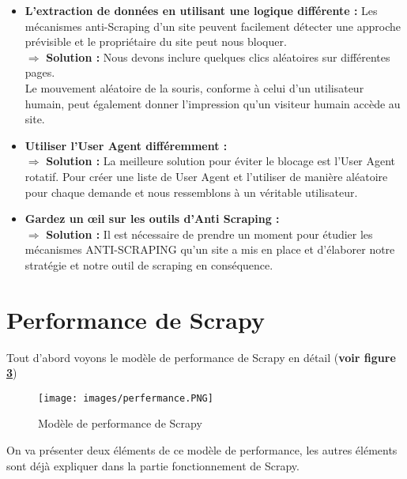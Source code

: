 \begin{itemize}[label=,font=\normalsize]
            \begin{figure}[H]
            \centering
            \texttt{[image: images/Mon IP.PNG]}
            \caption{Ma propre adresse IP}
            \label{fig:ip}  
        \end{figure}
        $\Rightarrow$ \textbf{Dans notre cas :} On utilise TOP Browser pour changer notre IP à chaque fois,\\ \noindent\textbf{la figure \ref{fig:Ban}} montre la nouvelle adresse définie par Tor Browser
        \begin{figure}[H]
            \centering
            \texttt{[image: images/TOR Browser.png]}
            \caption{Changer l'IP avec TOR Browser}
            \label{fig:Ban}  
        \end{figure}
        \item\textbf{L’extraction de données en utilisant une logique différente :} Les mécanismes anti-Scraping d'un site peuvent facilement détecter une approche prévisible et le propriétaire du site peut nous bloquer.\\
        $\Rightarrow$ \textbf{Solution :} Nous devons inclure quelques clics aléatoires sur différentes pages.\\ Le mouvement aléatoire de la souris, conforme à celui d'un utilisateur humain, peut également donner l'impression qu'un visiteur humain accède au site.
        \item\textbf{Utiliser l'User Agent différemment :}\\ $\Rightarrow$ \textbf{Solution :} La meilleure solution pour éviter le blocage est l'User Agent rotatif.
Pour créer une liste de User Agent et l'utiliser de manière aléatoire pour chaque demande et nous ressemblons à un véritable utilisateur.

        \item\textbf{Gardez un œil sur les outils d'Anti Scraping :}\\ $\Rightarrow$ \textbf{Solution :} Il est nécessaire de prendre un moment pour étudier les mécanismes ANTI-SCRAPING qu'un site a mis en place et d'élaborer notre stratégie et notre outil de scraping en conséquence. 
        \end{itemize}
\section{Performance de Scrapy}    
Tout d'abord voyons le modèle de performance de Scrapy en détail (\textbf{voir figure \ref{fig:perfermence}})
\begin{figure}[H]
            \centering
            \texttt{[image: images/perfermance.PNG]}
            \caption{Modèle de performance de Scrapy \cite{book}}
            \label{fig:perfermence}  
        \end{figure}
On va présenter deux éléments de ce modèle de performance, les autres éléments sont déjà expliquer dans la partie fonctionnement de Scrapy.\\

